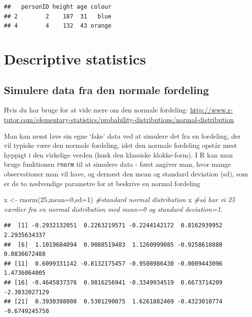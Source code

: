 \documentclass[
]{book}
\newenvironment{Shaded}{\begin{snugshade}}{\end{snugshade}}
\newcommand{\AttributeTok}[1]{\textcolor[rgb]{0.77,0.63,0.00}{#1}}
\newcommand{\CommentTok}[1]{\textcolor[rgb]{0.56,0.35,0.01}{\textit{#1}}}
\newcommand{\DecValTok}[1]{\textcolor[rgb]{0.00,0.00,0.81}{#1}}
\newcommand{\FunctionTok}[1]{\textcolor[rgb]{0.00,0.00,0.00}{#1}}
\newcommand{\NormalTok}[1]{#1}
\newcommand{\OtherTok}[1]{\textcolor[rgb]{0.56,0.35,0.01}{#1}}
\begin{document}
\begin{verbatim}
##   personID height age colour
## 2        2    187  31   blue
## 4        4    132  43 orange
\end{verbatim}

\hypertarget{descriptive-statistics}{%
\section{Descriptive statistics}\label{descriptive-statistics}}

\hypertarget{simulere-data-fra-den-normale-fordeling}{%
\subsection{Simulere data fra den normale fordeling}\label{simulere-data-fra-den-normale-fordeling}}

Hvis du har bruge for at vide mere om den normale fordeling: \url{http://www.r-tutor.com/elementary-statistics/probability-distributions/normal-distribution}

Man kan nemt lave sin egne `fake' data ved at simulere det fra en fordeling, der vil typiske være den normale fordeling, idet den normale fordeling opstår mest hyppigt i den virkelige verden (husk den klassiske klokke-form). I R kan man bruge funktionen \texttt{rnorm} til at simulere data - først angiver man, hvor mange observationer man vil have, og dernæst den mean og standard deviation (sd), som er de to nødvendige parametre for at beskrive en normal fordeling

\begin{Shaded}
\begin{Highlighting}[]
\NormalTok{x }\OtherTok{\textless{}{-}} \FunctionTok{rnorm}\NormalTok{(}\DecValTok{25}\NormalTok{,}\AttributeTok{mean=}\DecValTok{0}\NormalTok{,}\AttributeTok{sd=}\DecValTok{1}\NormalTok{) }\CommentTok{\#standard normal distribution}
\NormalTok{x }\CommentTok{\#så har vi 25 værdier fra en normal distribution med mean=0 og standard deviation=1.}
\end{Highlighting}
\end{Shaded}

\begin{verbatim}
##  [1] -0.2932132051  0.2263219571 -0.2244142172  0.8162939952  2.2935634337
##  [6]  1.1019684094  0.9088519403  1.1260999085 -0.9258610880  0.0836672488
## [11]  0.6099331142 -0.8132175457 -0.9508986430 -0.0009443096  1.4736064005
## [16] -0.4645837376  0.9816256941 -0.3349934519  0.6673714209 -2.3032027129
## [21]  0.3930398008  0.5301290075  1.6261882469 -0.4323010774 -0.6749245750
\end{verbatim}
\end{document}
